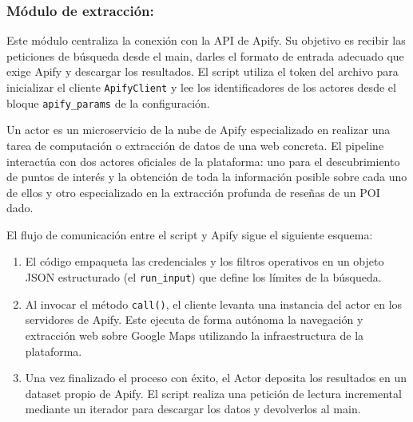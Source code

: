 \subsubsection{Módulo de extracción: }
Este módulo centraliza la conexión con la API de Apify. Su objetivo es recibir las peticiones de búsqueda desde el main, darles el formato de entrada adecuado que exige Apify y descargar los resultados. El script utiliza el token del archivo  para inicializar el cliente \texttt{ApifyClient} y lee los identificadores de los actores desde el bloque \texttt{apify\_params} de la configuración. 

Un actor es un microservicio de la nube de Apify especializado en realizar una tarea de computación o extracción de datos de una web concreta. El pipeline interactúa con dos actores oficiales de la plataforma: uno para el descubrimiento de puntos de interés y la obtención de toda la información posible sobre cada uno de ellos y otro especializado en la extracción profunda de reseñas de un POI dado.

El flujo de comunicación entre el script y Apify sigue el siguiente esquema:
\begin{enumerate}
    \item El código empaqueta las credenciales y los filtros operativos en un objeto JSON estructurado (el \texttt{run\_input}) que define los límites de la búsqueda.
    \item Al invocar el método \texttt{call()}, el cliente levanta una instancia del actor en los servidores de Apify. Este ejecuta de forma autónoma la navegación y extracción web sobre Google Maps utilizando la infraestructura de la plataforma.
    \item Una vez finalizado el proceso con éxito, el Actor deposita los resultados en un dataset propio de Apify. El script realiza una petición de lectura incremental mediante un iterador para descargar los datos y devolverlos al main.
\end{enumerate}


